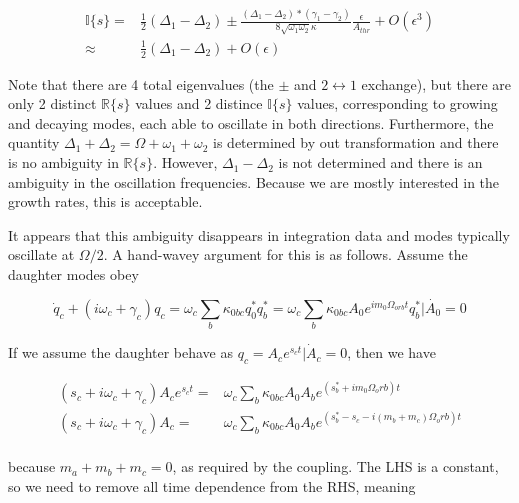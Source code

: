\begin{subequations}
\begin{align}
\mathbb{I}\{s\} = & \frac{1}{2}(\Delta_1-\Delta_2) \pm \frac{(\Delta_1-\Delta_2)*(\gamma_1-\gamma_2)}{8\sqrt{\omega_1\omega_2}\kappa}\frac{\epsilon}{A_{thr}} + O(\epsilon^3) \\
          \approx & \frac{1}{2}(\Delta_1-\Delta_2) + O(\epsilon) 
\end{align}
\end{subequations}

Note that there are 4 total eigenvalues (the $\pm$ and $2\leftrightarrow1$ exchange), but there are only 2 distinct $\mathbb{R}\{s\}$ values and 2 distince $\mathbb{I}\{s\}$ values, corresponding to growing and decaying modes, each able to oscillate in both directions. Furthermore, the quantity $\Delta_1+\Delta_2=\Omega+\omega_1+\omega_2$ is determined by out transformation and there is no ambiguity in $\mathbb{R}\{s\}$. However, $\Delta_1-\Delta_2$ is not determined and there is an ambiguity in the oscillation frequencies. Because we are mostly interested in the growth rates, this is acceptable. 

It appears that this ambiguity disappears in integration data and modes typically oscillate at $\Omega/2$. A hand-wavey argument for this is as follows. Assume the daughter modes obey

\begin{equation}
\dot{q}_c + (i\omega_c+\gamma_c)q_c = \omega_c \sum_b \kappa_{0bc} q_0^\ast q_b^\ast = \omega_c \sum_b \kappa_{0bc} A_0 e^{i m_0 \Omega_{orb}t} q_b^\ast | \dot{A_0} = 0
\end{equation}

If we assume the daughter behave as $q_c = A_c e^{s_c t} | \dot{A}_c=0$, then we have

\begin{subequations}
\begin{align}
(s_c + i\omega_c + \gamma_c) A_c e^{s_c t} = & \omega_c \sum_b \kappa_{0bc} A_0 A_b e^{(s_b^\ast + im_0\Omega_orb)t} \\
(s_c + i\omega_c + \gamma_c) A_c = & \omega_c \sum_b \kappa_{0bc} A_0 A_b e^{(s_b^\ast-s_c - i(m_b+m_c)\Omega_orb)t} \\
\end{align}
\end{subequations}

because $m_a+m_b+m_c=0$, as required by the coupling. The LHS is a constant, so we need to remove all time dependence from the RHS, meaning

